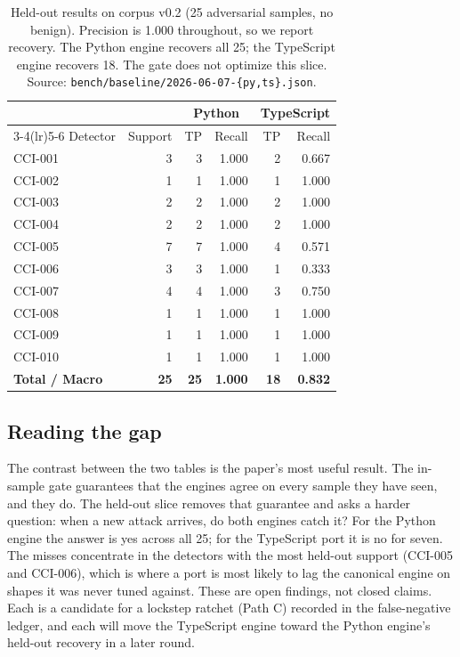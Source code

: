 \begin{table}[t]
\centering
\caption{Held-out results on corpus v0.2 (25 adversarial samples, no
benign). Precision is 1.000 throughout, so we report recovery. The
Python engine recovers all 25; the TypeScript engine recovers 18. The
gate does not optimize this slice. Source:
\texttt{bench/baseline/2026-06-07-\{py,ts\}.json}.}
\label{tab:holdout}
\begin{tabular}{l r r r r r}
\toprule
 & & \multicolumn{2}{c}{Python} & \multicolumn{2}{c}{TypeScript} \\
\cmidrule(lr){3-4}\cmidrule(lr){5-6}
Detector & Support & TP & Recall & TP & Recall \\
\midrule
CCI-001 & 3 & 3 & 1.000 & 2 & 0.667 \\
CCI-002 & 1 & 1 & 1.000 & 1 & 1.000 \\
CCI-003 & 2 & 2 & 1.000 & 2 & 1.000 \\
CCI-004 & 2 & 2 & 1.000 & 2 & 1.000 \\
CCI-005 & 7 & 7 & 1.000 & 4 & 0.571 \\
CCI-006 & 3 & 3 & 1.000 & 1 & 0.333 \\
CCI-007 & 4 & 4 & 1.000 & 3 & 0.750 \\
CCI-008 & 1 & 1 & 1.000 & 1 & 1.000 \\
CCI-009 & 1 & 1 & 1.000 & 1 & 1.000 \\
CCI-010 & 1 & 1 & 1.000 & 1 & 1.000 \\
\midrule
\textbf{Total / Macro} & \textbf{25} & \textbf{25} & \textbf{1.000} & \textbf{18} & \textbf{0.832} \\
\bottomrule
\end{tabular}
\end{table}

\subsection{Reading the gap}

The contrast between the two tables is the paper's most useful result.
The in-sample gate guarantees that the engines agree on every sample
they have seen, and they do. The held-out slice removes that guarantee
and asks a harder question: when a new attack arrives, do both engines
catch it? For the Python engine the answer is yes across all 25; for the
TypeScript port it is no for seven. The misses concentrate in the
detectors with the most held-out support (CCI-005 and CCI-006), which is
where a port is most likely to lag the canonical engine on shapes it was
never tuned against. These are open findings, not closed claims. Each is
a candidate for a lockstep ratchet (Path C) recorded in the
false-negative ledger, and each will move the TypeScript engine toward
the Python engine's held-out recovery in a later round.

